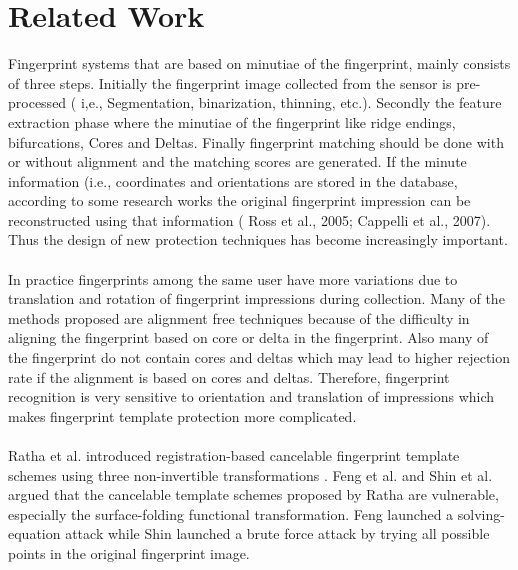 \documentclass[14pt, oneside]{article}   	%
\begin{document}
\section{Related Work}
Fingerprint systems that are based on minutiae of the fingerprint, mainly consists of three steps. Initially the fingerprint image collected from the sensor is pre-processed ( i,e., Segmentation, binarization, thinning, etc.). Secondly the feature extraction phase where the minutiae of the fingerprint like ridge endings, bifurcations, Cores and Deltas. Finally fingerprint matching should be done with or without alignment and the matching scores are generated.  If the minute information (i.e., coordinates and orientations are stored in the database, according to some research works the original fingerprint impression can be reconstructed using that information ( Ross et al., 2005; Cappelli et  al., 2007)\cite{3}. Thus the design of new protection techniques has become increasingly important.
\paragraph{}
In practice fingerprints among the same user have more variations due to translation and rotation of fingerprint impressions during collection. Many of the methods proposed are alignment free techniques because of the difficulty in aligning the fingerprint based on core or delta in the fingerprint. Also many of the fingerprint do not contain cores and deltas which may lead to higher rejection rate if the alignment is based on cores and deltas. Therefore, fingerprint recognition is very sensitive to orientation and translation of impressions which makes fingerprint template protection more complicated. \cite{4}
\paragraph{}
Ratha et al. introduced registration-based cancelable fingerprint template schemes using three non-invertible transformations\cite{5} . Feng et al. \cite{6}  and Shin et al. \cite{7} argued that the cancelable template schemes proposed by Ratha are vulnerable, especially the surface-folding functional transformation. Feng launched a solving- equation attack  while Shin launched a brute force attack by trying all possible points in the original fingerprint image.\cite{8}
\end{document}
